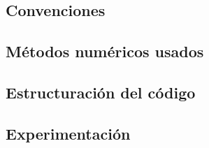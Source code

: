 \subsection{Convenciones}

\subsection{Métodos numéricos usados}

\subsection{Estructuración del código}

\subsection{Experimentación}

